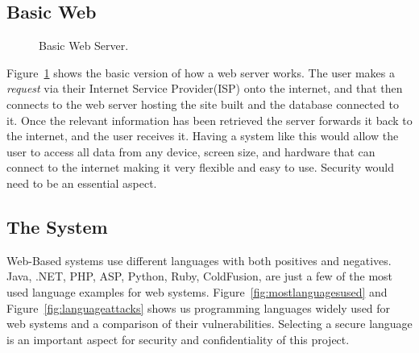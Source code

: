 \documentclass[../main.tex]{subfiles}
\begin{document}
\raggedright

\subsection{Basic Web}

	\begin{figure}[H]
        \caption{\label{fig:basicwebdesign} Basic Web Server.}
      \end{figure}
      
Figure~\ref{fig:basicwebdesign} shows the basic version of how a web server works. The user makes a \textit{request} via their Internet Service Provider(ISP) onto the internet, and that then connects to the web server hosting the site built and the database connected to it. Once the relevant information has been retrieved the server forwards it back to the internet, and the user receives it. Having a system like this would allow the user to access all data from any device, screen size, and hardware that can connect to the internet making it very flexible and easy to use. Security would need to be an essential aspect. 
      
\subsection{The System}
      
Web-Based systems use different languages with both positives and negatives. Java, .NET, PHP, ASP, Python, Ruby, ColdFusion, are just a few of the most used language examples for web systems\cite{securelanguage}. Figure~\ref{fig:mostlanguagesused} and Figure~\ref{fig:languageattacks} shows us programming languages widely used for web systems and a comparison of their vulnerabilities. Selecting a secure language is an important aspect for security and confidentiality of this project.  \\[2mm]
\end{document}
